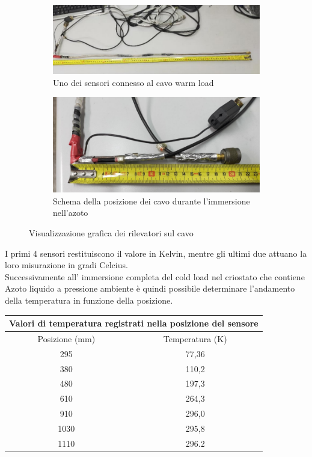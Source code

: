 \begin{figure}[h]
	\begin{subfigure}{0.49\textwidth}
		\includegraphics[width=\textwidth]{Posizione_sensori_2.png}
    		\caption{Uno dei sensori connesso al cavo warm load}
    		\label{fig:sub3}
	\end{subfigure}
	\hfill
	\begin{subfigure}{0.49\textwidth}
    		\includegraphics[width=\textwidth]{Posizione_sensori_4.png}
    		\caption{Schema della posizione dei cavo durante l'immersione nell'azoto}
    		\label{fig:sub4}
	\end{subfigure}

\caption{Visualizzazione grafica dei rilevatori sul cavo}
\label{fig:cavi}
\end{figure}


I primi 4 sensori restituiscono il valore in Kelvin, mentre gli ultimi due attuano la loro misurazione in gradi Celcius.\\
Successivamente all' immersione completa del cold load nel criostato che contiene Azoto liquido a pressione ambiente è quindi possibile determinare l'andamento della temperatura in funzione della posizione.   
\begin{table}
\centering

\begin{tabular}{ |c|c|  }
	\hline
	\multicolumn{2}{|c|}{Valori di temperatura registrati nella posizione del sensore} \\
	\hline
	Posizione (mm)& Temperatura (K) \\
	\hline
	295   & 77,36    \\
	380  & 110,2  \\
	480 &197,3 \\
	610    &264,3 \\
	910&   296,0  \\
	1030& 295,8  \\
	1110& 296.2  \\
	\hline
\end{tabular}

\end{table}

